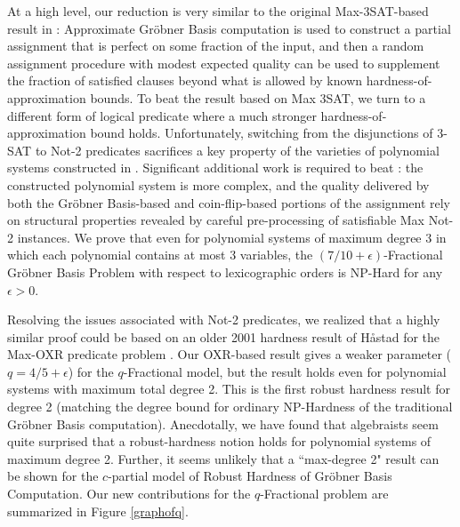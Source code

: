 \documentclass{article}
\begin{document}
At a high level, our reduction is very similar to the original Max-3SAT-based result  in \citep{RS}: Approximate Gr\"{o}bner Basis computation is used to construct a partial assignment that is perfect on some fraction of the input, and then a random assignment procedure with modest expected quality can be used to supplement the fraction of satisfied clauses beyond what is allowed by known hardness-of-approximation bounds.
To beat the result based on Max 3SAT, we turn to a different form of logical predicate where a much stronger hardness-of-approximation bound holds. Unfortunately, switching from the disjunctions of 3-SAT to Not-2 predicates sacrifices a key property of the varieties of polynomial systems constructed in \citep{RS}. Significant additional work is required to beat \citep{RS}: the constructed polynomial system is more complex, and the quality delivered by both the Gr\"{o}bner Basis-based and coin-flip-based portions of the assignment rely on structural properties revealed by careful pre-processing of satisfiable Max Not-2 instances. We prove that even for polynomial systems of maximum degree 3 in which each polynomial contains at most 3 variables, the $(7/10+\epsilon)$-Fractional Gr\"{o}bner Basis Problem with respect to lexicographic orders is NP-Hard for any $\epsilon>0$.



Resolving the issues associated with Not-2 predicates, we realized that a highly similar proof could be based on an older 2001 hardness result of H{\aa}stad for the Max-OXR predicate problem \citep{hast01}. Our OXR-based result gives a weaker parameter ($q=4/5+\epsilon$) for the $q$-Fractional model, but the result holds even 
for polynomial systems with maximum total degree 2. This is the first robust hardness result for degree 2 (matching the degree bound for ordinary NP-Hardness of the traditional Gr\"{o}bner Basis computation). Anecdotally, we have found that algebraists seem quite surprised that a robust-hardness notion holds for polynomial systems of maximum degree 2. Further, it seems unlikely that a ``max-degree 2" result can be shown for the $c$-partial model of Robust Hardness of Gr\"{o}bner Basis Computation.
Our new contributions for the $q$-Fractional problem are summarized in Figure \ref{graphofq}.
\end{document}
